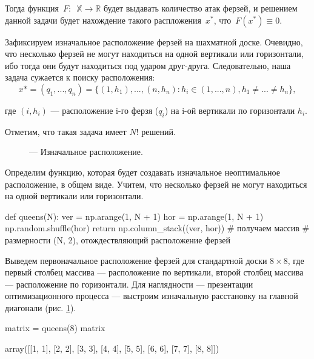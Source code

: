 Тогда  функция~$F:$~$\mathbb{X} \to \mathbb{R}$ будет выдавать количество атак ферзей, и решением данной задачи будет нахождение такого распложения~$x^{*}$, что~$F(x^*) \equiv 0$.

Зафиксируем изначальное расположение ферзей на шахматной доске. Очевидно, что несколько ферзей не могут находиться на одной вертикали или горизонтали, ибо тогда они будут находиться под ударом друг-друга. Следовательно, наша задача сужается к поиску расположения:
\begin{equation}
x* = (q_1, ..., q_n) = \{(1, h_1), ..., (n, h_n): h_i \in (1, ..., n), h_1 \neq ...  \neq h_n\},
\end{equation}

где $(i, h_i)$ — расположение i-го ферзя ($q_i$) на i-ой вертикали по горизонтали $h_i$.

Отметим, что такая задача имеет $N!$ решений.

\newgame
{}

\begin{figure}[h!]
	\begin{center}
		\showboard
		\legend{}
		\caption{ --- Изначальное расположение.}
		\label{img:nonopt}
	\end{center}
\end{figure}

Определим функцию, которая будет создавать изначальное неоптимальное расположение, в общем виде. Учитем, что несколько ферзей не могут находиться на одной вертикали или горизонтали.

\begin{pyin}
def queens(N):
  ver = np.arange(1, N + 1)
  hor = np.arange(1, N + 1)
  np.random.shuffle(hor)
  return np.column_stack((ver, hor)) # получаем массив
  # размерности (N, 2), отождествляющий расположение ферзей
\end{pyin}

Выведем первоначальное расположение ферзей для стандартной доски $8 \times 8$, где первый столбец массива — расположение по вертикали, второй столбец массива — расположение по горизонтали. Для наглядности — презентации оптимизационного процесса — выстроим изначальную расстановку на главной диагонали (рис. \ref{img:nonopt}).


\begin{pyin}
matrix = queens(8)
matrix
\end{pyin}

\begin{pyout}
array([[1, 1],
       [2, 2],
       [3, 3],
       [4, 4],
       [5, 5],
       [6, 6],
       [7, 7],
       [8, 8]])
\end{pyout}


